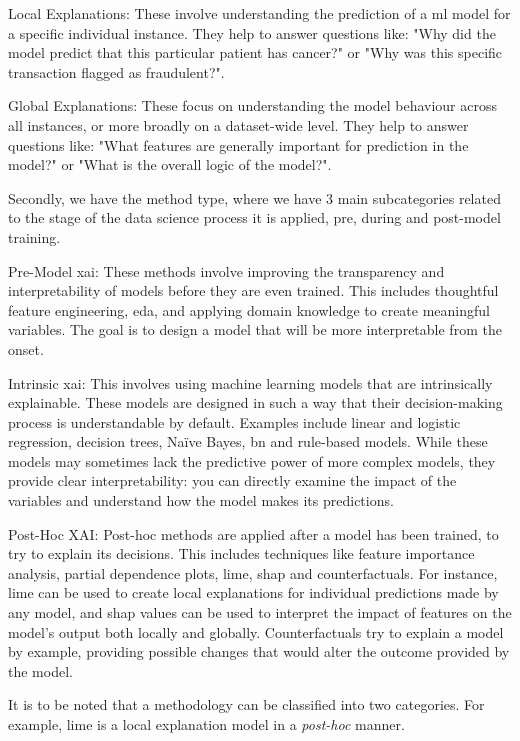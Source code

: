 Local Explanations: These involve understanding the prediction of a \ac{ml} model for a specific individual instance. They help to answer questions like: "Why did the model predict that this particular patient has cancer?" or "Why was this specific transaction flagged as fraudulent?". 

Global Explanations: These focus on understanding the model behaviour across all instances, or more broadly on a dataset-wide level. They help to answer questions like: "What features are generally important for prediction in the model?" or "What is the overall logic of the model?". 

Secondly, we have the method type, where we have 3 main subcategories related to the stage of the data science process it is applied, pre, during and post-model training.

Pre-Model \ac{xai}: These methods involve improving the transparency and interpretability of models before they are even trained. This includes thoughtful feature engineering, \ac{eda}, and applying domain knowledge to create meaningful variables. The goal is to design a model that will be more interpretable from the onset.

Intrinsic \ac{xai}: This involves using machine learning models that are intrinsically explainable. These models are designed in such a way that their decision-making process is understandable by default. Examples include linear and logistic regression, decision trees, Naïve Bayes, \ac{bn} and rule-based models. While these models may sometimes lack the predictive power of more complex models, they provide clear interpretability: you can directly examine the impact of the variables and understand how the model makes its predictions.

Post-Hoc XAI: Post-hoc methods are applied after a model has been trained, to try to explain its decisions. This includes techniques like feature importance analysis, partial dependence plots, \ac{lime}, \ac{shap} and counterfactuals. For instance, \ac{lime} can be used to create local explanations for individual predictions made by any model, and \ac{shap} values can be used to interpret the impact of features on the model's output both locally and globally. Counterfactuals try to explain a model by example, providing possible changes that would alter the outcome provided by the model.

It is to be noted that a methodology can be classified into two categories. For example, \ac{lime} is a local explanation model in a \textit{post-hoc} manner.

